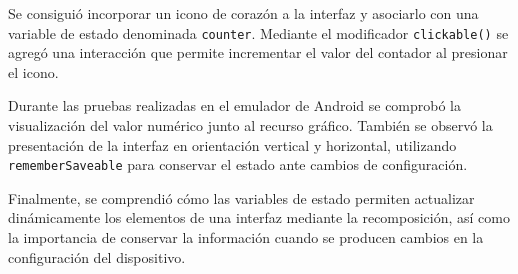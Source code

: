 \documentclass[12pt,a4paper]{article}
\begin{document}
Se consiguió incorporar un icono de corazón a la interfaz y asociarlo con una variable de estado denominada \texttt{counter}. Mediante el modificador \texttt{clickable()} se agregó una interacción que permite incrementar el valor del contador al presionar el icono.

Durante las pruebas realizadas en el emulador de Android se comprobó la visualización del valor numérico junto al recurso gráfico. También se observó la presentación de la interfaz en orientación vertical y horizontal, utilizando \texttt{rememberSaveable} para conservar el estado ante cambios de configuración.

Finalmente, se comprendió cómo las variables de estado permiten actualizar dinámicamente los elementos de una interfaz mediante la recomposición, así como la importancia de conservar la información cuando se producen cambios en la configuración del dispositivo.
\end{document}
